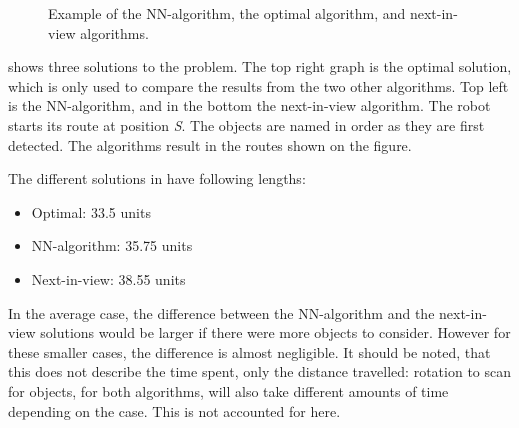 \begin{figure}[H]
     \caption{\label{fig:algorithm-example} Example of the NN-algorithm, the optimal algorithm, and next-in-view algorithms.}
\end{figure}

 shows three solutions to the problem. The top right graph is the optimal solution, which is only used to compare the results from the two other algorithms. Top left is the NN-algorithm, and in the bottom the next-in-view algorithm. The robot starts its route at position \emph{S}. The objects are named in order as they are first detected. The algorithms result in the routes shown on the figure.

The different solutions in  have following lengths:
\begin{itemize}
\item Optimal: 33.5 units
\item NN-algorithm: 35.75 units
\item Next-in-view: 38.55 units
\end{itemize}

In the average case, the difference between the NN-algorithm and the next-in-view solutions would be larger if there were more objects to consider. However for these smaller cases, the difference is almost negligible. It should be noted, that this does not describe the time spent, only the distance travelled: rotation to scan for objects, for both algorithms, will also take different amounts of time depending on the case. This is not accounted for here.

